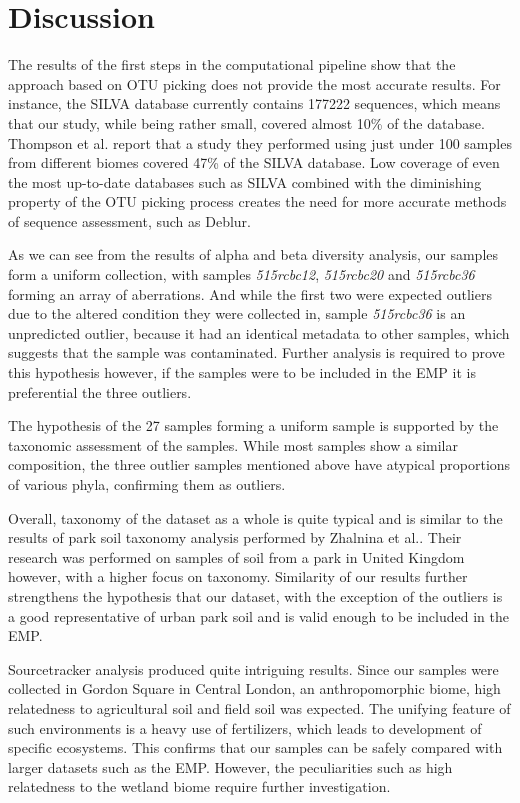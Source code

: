 \documentclass[12pt,twocolumn]{article} %
\begin{document}
\section{Discussion}
The results of the first steps in the computational pipeline show that the approach based on OTU picking does not provide the most accurate results. For instance, the SILVA database currently contains 177222 sequences, which means that our study, while being rather small, covered almost 10\% of the database. Thompson et al.\cite{Thompson2017} report that a study they performed using just under 100 samples from different biomes covered  47\% of the SILVA database. Low coverage of even the most up-to-date databases such as SILVA combined with the diminishing property of the OTU picking process creates the need for more accurate methods of sequence assessment, such as Deblur\cite{Amir}. 
\par
As we can see from the results of alpha and beta diversity analysis, our samples form a uniform collection, with samples \textit{515rcbc12}, \textit{515rcbc20} and \textit{515rcbc36} forming an array of aberrations. And while the first two were expected outliers due to the altered condition they were collected in, sample \textit{515rcbc36} is an unpredicted outlier, because it had an identical metadata to other samples, which suggests that the sample was contaminated. Further analysis is required to prove this hypothesis however, if the samples were to be included in the EMP it is preferential the three outliers.
\par
The hypothesis of the 27 samples forming a uniform sample is supported by the taxonomic assessment of the samples. While most samples show a similar composition, the three outlier samples mentioned above have atypical proportions of various phyla, confirming them as outliers.
\par
Overall, taxonomy of the dataset as a whole is quite typical and is similar to the results of park soil taxonomy analysis performed by Zhalnina et al.\cite{Zhalnina2014}. Their research was performed on samples of soil from a park in United Kingdom however, with a higher focus on taxonomy. Similarity of our results further strengthens the hypothesis that our dataset, with the exception of the outliers is a good representative of urban park soil and is valid enough to be included in the EMP.
\par
Sourcetracker analysis produced quite intriguing results.  Since our samples were collected in Gordon Square in Central London, an anthropomorphic biome, high relatedness to agricultural soil and field soil was expected. The unifying feature of such environments is a heavy use of fertilizers, which leads to development of specific ecosystems. This confirms that our samples can be safely compared with larger datasets such as the EMP. However, the peculiarities such as high relatedness to the wetland biome require further investigation.
\end{document}
